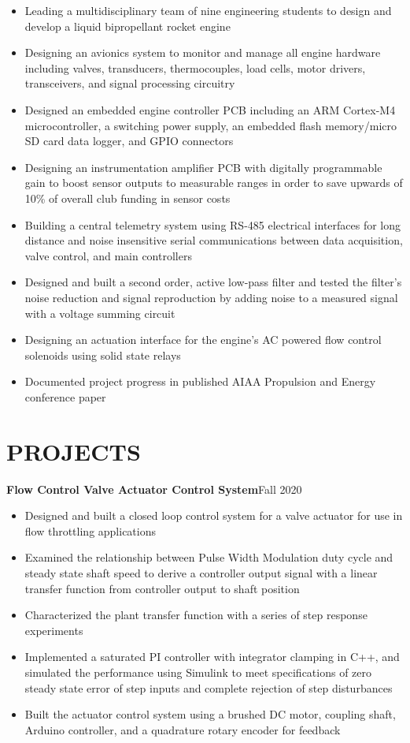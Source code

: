 \documentclass{article}
\begin{document}
\begin{itemize}
\item{Leading a multidisciplinary team of nine engineering students to design and develop a liquid bipropellant rocket engine}
	\item{Designing an avionics system to monitor and manage all engine hardware including valves, transducers, thermocouples, load cells, motor drivers, transceivers, and signal processing circuitry}
\item{Designed an embedded engine controller PCB including an ARM Cortex-M4 microcontroller, a switching power supply, an embedded flash memory/micro SD card data logger, and GPIO connectors}
	\item{Designing an instrumentation amplifier PCB with digitally programmable gain to boost sensor outputs to measurable ranges in order to save upwards of 10\% of overall club funding in sensor costs}
	\item{Building a central telemetry system using RS-485 electrical interfaces for long distance and noise insensitive serial communications between data acquisition, valve control, and main controllers}
	\item{Designed and built a second order, active low-pass filter and tested the filter's noise reduction and signal reproduction by adding noise to a measured signal with a voltage summing circuit}
\item{Designing an actuation interface for the engine's AC powered flow control solenoids using solid state relays}
	\item{Documented project progress in published AIAA Propulsion and Energy conference paper}
\end{itemize}
\section{PROJECTS}
\vspace{0.5em}
\textbf{Flow Control Valve Actuator Control System}\hfill Fall 2020
\vspace{0.5em}
\begin{itemize}
	\item {Designed and built a closed loop control system for a valve actuator for use in flow throttling applications}
	\item {Examined the relationship between Pulse Width Modulation duty cycle and steady state shaft speed to derive a controller output signal with a linear transfer function from controller output to shaft position} 
	\item {Characterized the plant transfer function with a series of step response experiments}
 \item  {Implemented a saturated PI controller with integrator clamping in C++, and simulated the performance using Simulink to meet specifications of zero steady state error of step inputs and complete rejection of step disturbances}
	\item  {Built the actuator control system using a brushed DC motor, coupling shaft, Arduino controller, and a quadrature rotary encoder for feedback}
\end{itemize}
\thispagestyle{empty}
\end{document}
